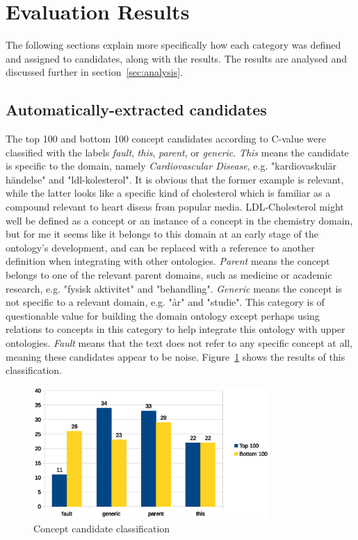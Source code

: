 \documentclass[a4paper]{report}
\begin{document}
\section{Evaluation Results}
\label{sec:results:eval}

The following sections explain more specifically how each category was defined and assigned to candidates, along with the results.
The results are analysed and discussed further in section~\ref{sec:analysis}.

\subsection{Automatically-extracted candidates}
\label{sec:results:eval:cands}

The top 100 and bottom 100 concept candidates according to C-value were classified with the labels \emph{fault}, \emph{this}, \emph{parent}, or \emph{generic}.
\emph{This} means the candidate is specific to the domain, namely \emph{Cardiovascular Disease}, e.g. "kardiovaskulär händelse" and "ldl-kolesterol".
It is obvious that the former example is relevant, while the latter looks like a specific kind of cholesterol which is familiar as a compound relevant to heart diseas from popular media.
LDL-Cholesterol might well be defined as a concept or an instance of a concept in the chemistry domain, but for me it seems like it belongs to this domain at an early stage of the ontology's development, and can be replaced with a reference to another definition when integrating with other ontologies.
\emph{Parent} means the concept belongs to one of the relevant parent domains, such as medicine or academic research, e.g. "fysisk aktivitet" and "behandling".
\emph{Generic} means the concept is not specific to a relevant domain, e.g. "år" and "studie".
This category is of questionable value for building the domain ontology except perhaps using relations to concepts in this category to help integrate this ontology with upper ontologies.
\emph{Fault} means that the text does not refer to any specific concept at all, meaning these candidates appear to be noise.
Figure~\ref{fig:concept-cands} shows the results of this classification.

\begin{figure}
  \centering
  \includegraphics[width=0.8\textwidth]{graphics/concepts.eps}
  \caption{Concept candidate classification}
  \label{fig:concept-cands}
\end{figure}
\end{document}

